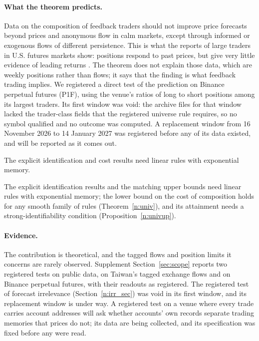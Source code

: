 \paragraph{What the theorem predicts.} Data on the composition of feedback traders should not improve price forecasts beyond prices and anonymous flow in calm markets, except through informed or exogenous flows of different persistence. This is what the reports of large traders in U.S. futures markets show: positions respond to past prices, but give very little evidence of leading returns \citep{sanders2009}. The theorem does not explain those data, which are weekly positions rather than flows; it says that the finding is what feedback trading implies. We registered a direct test of the prediction on Binance perpetual futures (P1F), using the venue's ratios of long to short positions among its largest traders. Its first window was void: the archive files for that window lacked the trader-class fields that the registered universe rule requires, so no symbol qualified and no outcome was computed. A replacement window from 16 November 2026 to 14 January 2027 was registered before any of its data existed, and will be reported as it comes out.

The explicit identification and cost results need linear rules with exponential memory.

The explicit identification results and the matching upper bounds need linear rules with exponential memory; the lower bound on the cost of composition holds for any smooth family of rules (Theorem~\ref{n:univ}), and its attainment needs a strong-identifiability condition (Proposition~\ref{n:univup}).

\paragraph{Evidence.} The contribution is theoretical, and the tagged flows and position limits it concerns are rarely observed. Supplement Section~\ref{sec:scope} reports two registered tests on public data, on Taiwan's tagged exchange flows and on Binance perpetual futures, with their readouts as registered. The registered test of forecast irrelevance (Section~\ref{n:irr_sec}) was void in its first window, and its replacement window is under way. A registered test on a venue where every trade carries account addresses will ask whether accounts' own records separate trading memories that prices do not; its data are being collected, and its specification was fixed before any were read.

